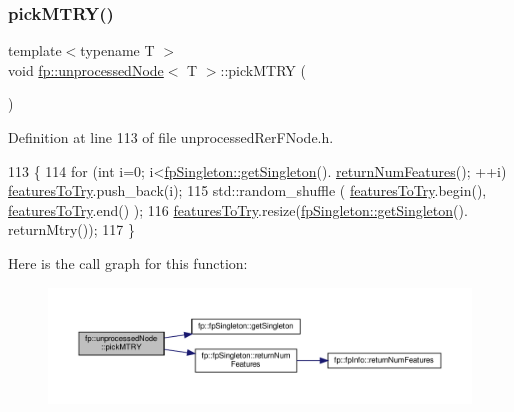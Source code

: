 \subsubsection{\texorpdfstring{pick\+M\+T\+R\+Y()}{pickMTRY()}\hspace{0.1cm}{\footnotesize\ttfamily [2/2]}}
{\footnotesize\ttfamily template$<$typename T $>$ \\
void \hyperlink{classfp_1_1unprocessedNode}{fp\+::unprocessed\+Node}$<$ T $>$\+::pick\+M\+T\+RY (\begin{DoxyParamCaption}{ }\end{DoxyParamCaption})\hspace{0.3cm}{\ttfamily [inline]}}



Definition at line 113 of file unprocessed\+Rer\+F\+Node.\+h.


\begin{DoxyCode}
113                                       \{
114                     \textcolor{keywordflow}{for} (\textcolor{keywordtype}{int} i=0; i<\hyperlink{classfp_1_1fpSingleton_a8bdae77b68521003e3fc630edec2e240}{fpSingleton::getSingleton}().
      \hyperlink{classfp_1_1fpSingleton_a97cbcad5ae9daa8c747fd4db84928c20}{returnNumFeatures}(); ++i) \hyperlink{classfp_1_1unprocessedNode_ab625569c5339dfbe93b487765f530313}{featuresToTry}.push\_back(i);
115                     std::random\_shuffle ( \hyperlink{classfp_1_1unprocessedNode_ab625569c5339dfbe93b487765f530313}{featuresToTry}.begin(), 
      \hyperlink{classfp_1_1unprocessedNode_ab625569c5339dfbe93b487765f530313}{featuresToTry}.end() );
116                     \hyperlink{classfp_1_1unprocessedNode_ab625569c5339dfbe93b487765f530313}{featuresToTry}.resize(\hyperlink{classfp_1_1fpSingleton_a8bdae77b68521003e3fc630edec2e240}{fpSingleton::getSingleton}().
      returnMtry());
117                 \}
\end{DoxyCode}
Here is the call graph for this function\+:
\nopagebreak
\begin{figure}[H]
\begin{center}
\leavevmode
\includegraphics[width=350pt]{classfp_1_1unprocessedNode_a5302bdd3ad2b0de3e2fcd8ed1bf58f61_cgraph}
\end{center}
\end{figure}
\mbox{\label{classfp_1_1unprocessedNode_ace7db1655a4f21d4d39c989ff1db806b}} 
